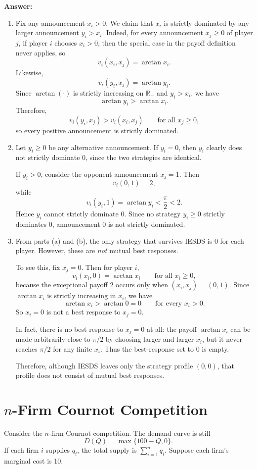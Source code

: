 \documentclass[12pt,a4paper]{article}
\begin{document}
\noindent\textbf{Answer:}
\begin{enumerate}[label=(\alph*)]
  \item Fix any announcement $x_i>0$. We claim that $x_i$ is strictly dominated by any larger announcement $y_i>x_i$. Indeed, for every announcement $x_j\ge 0$ of player $j$, if player $i$ chooses $x_i>0$, then the special case in the payoff definition never applies, so
  \[
    v_i(x_i,x_j)=\arctan x_i.
  \]
  Likewise,
  \[
    v_i(y_i,x_j)=\arctan y_i.
  \]
  Since $\arctan(\cdot)$ is strictly increasing on $\mathbb{R}_{+}$ and $y_i>x_i$, we have
  \[
    \arctan y_i>\arctan x_i.
  \]
  Therefore,
  \[
    v_i(y_i,x_j)>v_i(x_i,x_j) \qquad \text{for all } x_j\ge 0,
  \]
  so every positive announcement is strictly dominated.

  \item Let $y_i\ge 0$ be any alternative announcement. If $y_i=0$, then $y_i$ clearly does not strictly dominate $0$, since the two strategies are identical.

  If $y_i>0$, consider the opponent announcement $x_j=1$. Then
  \[
    v_i(0,1)=2,
  \]
  while
  \[
    v_i(y_i,1)=\arctan y_i<\frac{\pi}{2}<2.
  \]
  Hence $y_i$ cannot strictly dominate $0$. Since no strategy $y_i\ge 0$ strictly dominates $0$, announcement $0$ is not strictly dominated.

  \item From parts (a) and (b), the only strategy that survives IESDS is $0$ for each player. However, these are \emph{not} mutual best responses.

  To see this, fix $x_j=0$. Then for player $i$,
  \[
    v_i(x_i,0)=\arctan x_i \qquad \text{for all } x_i\ge 0,
  \]
  because the exceptional payoff $2$ occurs only when $(x_i,x_j)=(0,1)$. Since $\arctan x_i$ is strictly increasing in $x_i$, we have
  \[
    \arctan x_i>\arctan 0=0 \qquad \text{for every } x_i>0.
  \]
  So $x_i=0$ is not a best response to $x_j=0$.

  In fact, there is no best response to $x_j=0$ at all: the payoff $\arctan x_i$ can be made arbitrarily close to $\pi/2$ by choosing larger and larger $x_i$, but it never reaches $\pi/2$ for any finite $x_i$. Thus the best-response set to $0$ is empty.

  Therefore, although IESDS leaves only the strategy profile $(0,0)$, that profile does not consist of mutual best responses.
\end{enumerate}

\section{\texorpdfstring{$n$}{n}-Firm Cournot Competition}
Consider the $n$-firm Cournot competition. The demand curve is still
\[
  D(Q) = \max\{100-Q, 0\}.
\]
If each firm $i$ supplies $q_i$, the total supply is $\sum_{i=1}^n q_i$. Suppose each firm’s marginal cost is 10.
\end{document}
